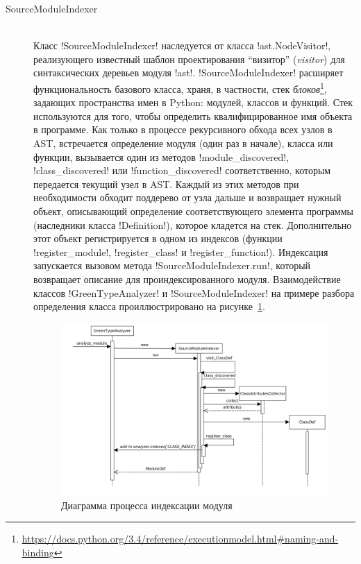 \begin{description}
  \item[SourceModuleIndexer] \hfill \\ 
    Класс !SourceModuleIndexer! наследуется от
    класса !ast.NodeVisitor!, реализующего известный шаблон проектирования
    ``визитор'' (\emph{visitor}) для синтаксических деревьев модуля !ast!. 
    !SourceModuleIndexer! расширяет функциональность базового класса, храня, в частности, стек
    \emph{блоков}\footnote{\url{https://docs.python.org/3.4/reference/executionmodel.html\#naming-and-binding}},
    задающих пространства имен в Python: модулей, классов и функций. Стек
    используются для того, чтобы определить квалифицированное имя объекта в
    программе.  Как только в процессе рекурсивного обхода всех узлов в AST,
    встречается определение модуля (один раз в начале), класса или функции,
    вызывается один из методов !module_discovered!, !class_discovered! или
    !function_discovered!  соответственно, которым передается текущий узел в
    AST. Каждый из этих методов при необходимости обходит поддерево от узла
    дальше и возвращает нужный объект, описывающий определение соответствующего
    элемента программы (наследники класса !Definition!), которое кладется на
    стек. Дополнительно этот объект регистрируется в одном из индексов (функции
    !register_module!, !register_class! и !register_function!).  Индексация
    запускается вызовом метода !SourceModuleIndexer.run!, который возвращает
    описание для проиндексированного модуля. Взаимодействие классов
    !GreenTypeAnalyzer! и !SourceModuleIndexer! на примере разбора определения
    класса проиллюстрировано на рисунке~\ref{fig:indexing-diag}.

  \begin{figure}
  \begin{center}
      \includegraphics[width=\textwidth]{fig/indexing-diag.png}
  \end{center}
  \caption{Диаграмма процесса индексации модуля}
  \label{fig:indexing-diag}
  \end{figure}


\end{description}
